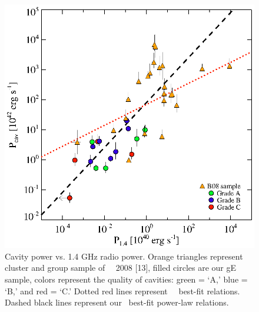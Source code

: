 \documentclass[letterpaper,11pt]{article}
\begin{document}
\begin{figure}[t]
\begin{minipage}[t]{0.5\linewidth}
        \includegraphics*[width=\textwidth, trim=30mm 5mm 40mm 15mm, clip]{pjet.eps}
        \caption{\footnotesize Cavity power vs. 1.4 GHz radio
          power. Orange triangles represent cluster and group sample
          of \birzan\ \etal\ 2008 [13], filled circles are our gE
          sample, colors represent the quality of cavities: green =
          `A,' blue = `B,' and red = `C.' Dotted red lines represent
          \birzan\ \etal\ best-fit relations. Dashed black lines
          represent our \bces\ best-fit power-law relations.}
        \label{fig:pjet}
    \end{minipage}
\end{figure}
\end{document}
